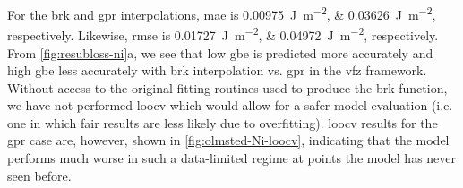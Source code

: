 \documentclass[final,twocolumn,12pt]{elsarticle}
\begin{document}
%
%
For the \gls{brk} and \gls{gpr} interpolations, \gls{mae} is \SIlist{0.00975;0.03626}{\J\per\square\m}, respectively. Likewise, \gls{rmse} is \SIlist{0.01727;0.04972}{\J\per\square\m}, respectively. From \cref{fig:resubloss-ni}a, we see that low \gls{gbe} is predicted more accurately and high \gls{gbe} less accurately with \gls{brk} interpolation vs. \gls{gpr} in the \gls{vfz} framework. Without access to the original fitting routines used to produce the \gls{brk} function, we have not performed \gls{loocv} which would allow for a safer model evaluation (i.e. one in which fair results are less likely due to overfitting). \Gls{loocv} results for the \gls{gpr} case are, however, shown in \cref{fig:olmsted-Ni-loocv}, indicating that the model performs much worse in such a data-limited regime at points the model has never seen before.
\end{document}
